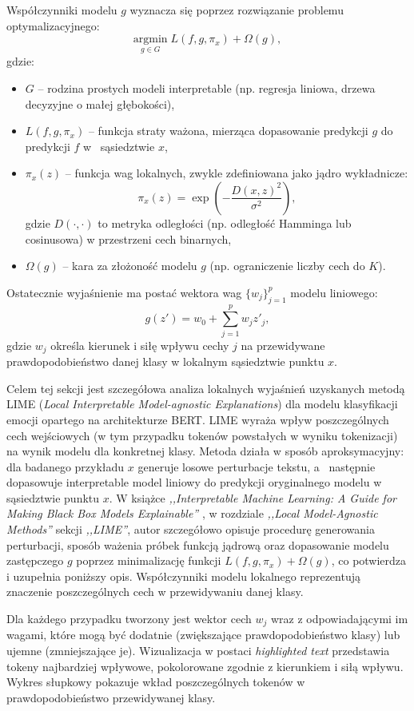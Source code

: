 \documentclass[wmii, inf, mgr]{uwmthesis}
\begin{document}
Współczynniki modelu $g$ wyznacza się poprzez rozwiązanie problemu optymalizacyjnego:
\[
\underset{g \in G}{\text{argmin}} \; L(f, g, \pi_x) + \Omega(g),
\]
gdzie:
\begin{itemize}
    \item $G$ -- rodzina prostych modeli interpretable (np. regresja liniowa, drzewa decyzyjne o małej głębokości),
    \item $L(f, g, \pi_x)$ -- funkcja straty ważona, mierząca dopasowanie predykcji $g$ do predykcji $f$ w~ sąsiedztwie $x$,
    \item $\pi_x(z)$ -- funkcja wag lokalnych, zwykle zdefiniowana jako jądro wykładnicze:
    \[
    \pi_x(z) = \exp\left(- \frac{D(x, z)^2}{\sigma^2}\right),
    \]
    gdzie $D(\cdot,\cdot)$ to metryka odległości (np. odległość Hamminga lub cosinusowa) w przestrzeni cech binarnych,
    \item $\Omega(g)$ -- kara za złożoność modelu $g$ (np. ograniczenie liczby cech do $K$).
\end{itemize}

Ostatecznie wyjaśnienie ma postać wektora wag $\{w_j\}_{j=1}^p$ modelu liniowego:
\[
g(z') = w_0 + \sum_{j=1}^p w_j z'_j,
\]
gdzie $w_j$ określa kierunek i siłę wpływu cechy $j$ na przewidywane prawdopodobieństwo danej klasy w lokalnym sąsiedztwie punktu $x$.


Celem tej sekcji jest szczegółowa analiza lokalnych wyjaśnień uzyskanych metodą LIME
(\textit{Local Interpretable Model-agnostic Explanations}) dla modelu klasyfikacji emocji opartego na architekturze BERT. LIME wyraża wpływ poszczególnych cech wejściowych (w tym przypadku tokenów powstałych w wyniku tokenizacji) na wynik modelu dla konkretnej klasy. Metoda działa w sposób aproksymacyjny: dla badanego przykładu $x$ generuje losowe perturbacje tekstu, a~ następnie dopasowuje interpretable model liniowy do predykcji oryginalnego modelu w sąsiedztwie punktu $x$.
W książce \textit{,,Interpretable Machine Learning: A Guide for Making Black Box Models Explainable''} \cite{SHAP}, w rozdziale \textit{,,Local Model-Agnostic Methods''} sekcji \textit{,,LIME''}, autor szczegółowo opisuje procedurę generowania perturbacji, sposób ważenia próbek funkcją jądrową oraz dopasowanie modelu zastępczego $g$ poprzez minimalizację funkcji $L(f,g,\pi_x) + \Omega(g)$, co potwierdza i uzupełnia poniższy opis. Współczynniki modelu lokalnego reprezentują znaczenie poszczególnych cech w przewidywaniu danej klasy.

Dla każdego przypadku tworzony jest wektor cech $w_j$ wraz z odpowiadającymi im wagami, które mogą być dodatnie (zwiększające prawdopodobieństwo klasy) lub ujemne (zmniejszające je).
Wizualizacja w postaci \textit{highlighted text} przedstawia tokeny najbardziej wpływowe, pokolorowane zgodnie z kierunkiem i siłą wpływu. Wykres słupkowy pokazuje wkład poszczególnych tokenów w prawdopodobieństwo przewidywanej klasy.
\end{document}
